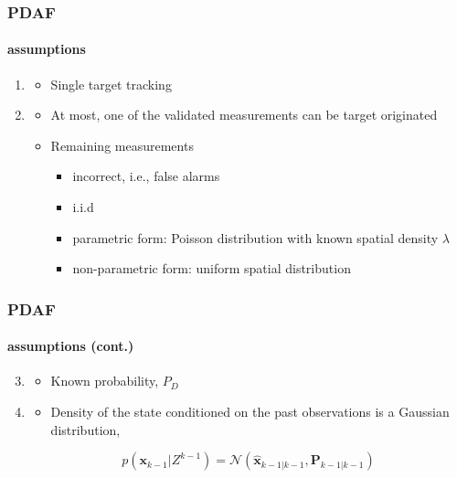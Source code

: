 \begin{frame}
\frametitle{PDAF}
\framesubtitle{assumptions}
\logoCSIPCPL\mypagenum
	\begin{enumerate}
		\item  {\color{red}{Number of targets}}
		\begin{itemize}
			\item Single target tracking
		\end{itemize}
		\item {\color{red}{False alarms}}
		\begin{itemize} 
			\item At most, one of the validated measurements can be target originated	
			\item Remaining measurements
			\begin{itemize}
				\item incorrect, i.e., false alarms
				\item i.i.d
				\item parametric form: Poisson distribution with known spatial density $\lambda$
				\item non-parametric form: uniform spatial distribution
			\end{itemize}
		\end{itemize}
	\end{enumerate}
\end{frame}
	



\begin{frame}
\frametitle{PDAF}
\framesubtitle{assumptions (cont.)}
\logoCSIPCPL\mypagenum
	\begin{enumerate}\setcounter{enumi}{2}
		\item {\color{red}{Target detection}}
		\begin{itemize} 
			\item Known probability, $P_D$
		\end{itemize}
		\item {\color{red}{Prior}}
		\begin{itemize} 
			\item Density of the state conditioned on the past observations is a Gaussian distribution,		
		\end{itemize}
		\begin{equation*}
			p(\mathbf{x}_{k-1}|Z^{k-1}) = \mathcal{N}  (  \hat{\mathbf{x}}_{k-1|k-1}, \mathbf{P}_{k-1|k-1})
		\end{equation*}
	\end{enumerate}
\end{frame}



